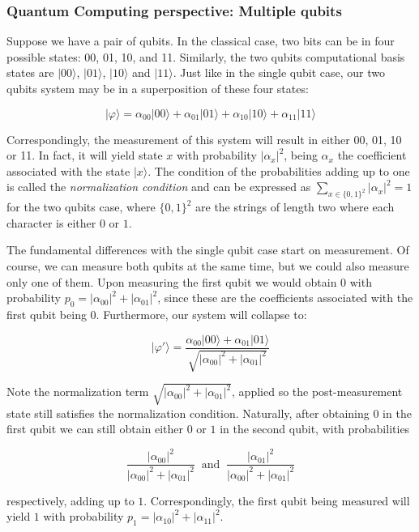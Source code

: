 \subsubsection{Quantum Computing perspective: Multiple qubits}


Suppose we have a pair of qubits. In the classical case, two bits can be in four possible states: 00, 01, 10, and 11. Similarly, the two qubits computational basis states are $|00\rangle$, $|01\rangle$, $|10\rangle$ and $|11\rangle$. Just like in the single qubit case, our two qubits system may be in a superposition of these four states:

$$ |\varphi\rangle = \alpha_{00} |00\rangle + \alpha_{01} |01\rangle + \alpha_{10} |10\rangle + \alpha_{11} |11\rangle $$

Correspondingly, the measurement of this system will result in either 00, 01, 10 or 11. In fact, it will yield state $x$ with probability $|\alpha_x|^2$, being $\alpha_x$ the coefficient associated with the state $|x\rangle$. The condition of the probabilities adding up to one is called the \emph{normalization condition} and can be expressed as $\sum_{x \in \{0,1\}^2} |\alpha_x|^2 = 1$ for the two qubits case, where $\{0,1\}^2$ are the strings of length two where each character is either $0$ or $1$.

The fundamental differences with the single qubit case start on measurement. Of course, we can measure both qubits at the same time, but we could also measure only one of them. Upon measuring the first qubit we would obtain $0$ with probability $p_0 = |\alpha_{00}|^2 + |\alpha_{01}|^2$, since these are the coefficients associated with the first qubit being $0$. Furthermore, our system will collapse to:

$$ |\varphi'\rangle = \frac{ \alpha_{00} |00\rangle + \alpha_{01} |01\rangle }{ \sqrt{|\alpha_{00}|^2 + |\alpha_{01}|^2} } $$

Note the normalization term $\sqrt{|\alpha_{00}|^2 + |\alpha_{01}|^2}$, applied so the post-measurement state still satisfies the normalization condition. Naturally, after obtaining $0$ in the first qubit we can still obtain either $0$ or $1$ in the second qubit, with probabilities 

$$ \frac{ |\alpha_{00}|^2 }{ |\alpha_{00}|^2 + |\alpha_{01}|^2 }  \ \text{ and } \ 
\frac{ |\alpha_{01}|^2 }{ |\alpha_{00}|^2 + |\alpha_{01}|^2 } $$

respectively, adding up to $1$. Correspondingly, the first qubit being measured will yield $1$ with probability $p_1 = |\alpha_{10}|^2 + |\alpha_{11}|^2$.

